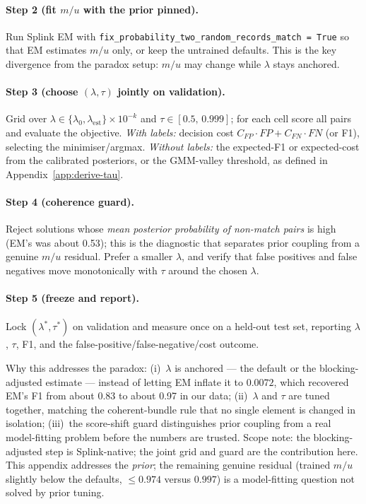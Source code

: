 \documentclass[conference]{IEEEtran}
\begin{document}
\begin{appendices}
\paragraph{Step 2 (fit $m/u$ with the prior pinned).} Run Splink EM with \texttt{fix\_probability\_two\_random\_}\allowbreak\texttt{records\_match = True} so that EM estimates $m/u$ only, or keep the untrained defaults. This is the key divergence from the paradox setup: $m/u$ may change while $\lambda$ stays anchored.

\paragraph{Step 3 (choose $(\lambda,\tau)$ jointly on validation).} Grid over $\lambda\in\{\lambda_0,\lambda_\mathrm{est}\}\times 10^{-k}$ and $\tau\in[0.5,\,0.999]$; for each cell score all pairs and evaluate the objective. \emph{With labels:} decision cost $C_{FP}\cdot FP + C_{FN}\cdot FN$ (or F1), selecting the minimiser/argmax. \emph{Without labels:} the expected-F1 or expected-cost from the calibrated posteriors, or the GMM-valley threshold, as defined in Appendix~\ref{app:derive-tau}.

\paragraph{Step 4 (coherence guard).} Reject solutions whose \emph{mean posterior probability of non-match pairs} is high (EM's was about 0.53); this is the diagnostic that separates prior coupling from a genuine $m/u$ residual. Prefer a smaller $\lambda$, and verify that false positives and false negatives move monotonically with $\tau$ around the chosen $\lambda$.

\paragraph{Step 5 (freeze and report).} Lock $(\lambda^*,\tau^*)$ on validation and measure once on a held-out test set, reporting $\lambda$, $\tau$, F1, and the false-positive/false-negative/cost outcome.

Why this addresses the paradox: (i)~$\lambda$ is anchored --- the default or the blocking-adjusted estimate --- instead of letting EM inflate it to $0.0072$, which recovered EM's F1 from about 0.83 to about 0.97 in our data; (ii)~$\lambda$ and $\tau$ are tuned together, matching the coherent-bundle rule that no single element is changed in isolation; (iii)~the score-shift guard distinguishes prior coupling from a real model-fitting problem before the numbers are trusted. Scope note: the blocking-adjusted step is Splink-native; the joint grid and guard are the contribution here. This appendix addresses the \emph{prior}; the remaining genuine residual (trained $m/u$ slightly below the defaults, $\le 0.974$ versus $0.997$) is a model-fitting question not solved by prior tuning.

\end{appendices}
\end{document}
